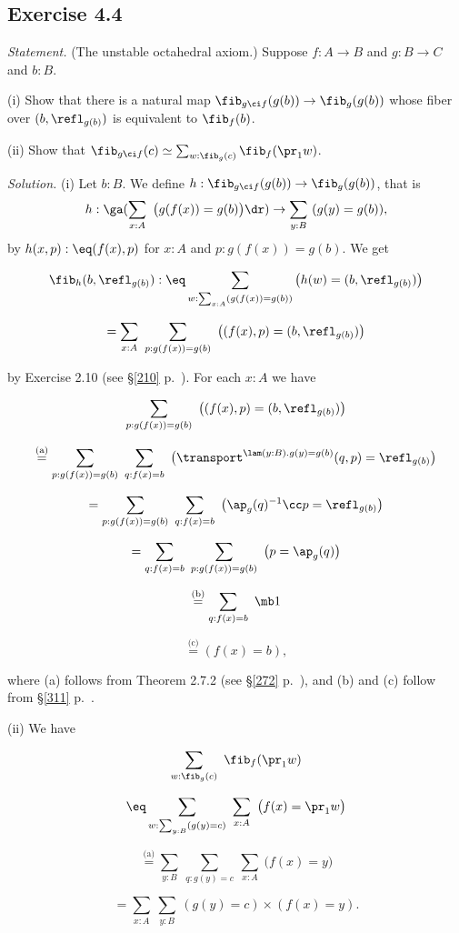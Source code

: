 \documentclass[12pt]{article}
\begin{document}

\subsection{Exercise 4.4}

\emph{Statement.} (The unstable octahedral axiom.) Suppose $f:A\to B$ and $g:B\to C$ and $b:B$.

\nn(i) Show that there is a natural map $\fib_{g\ci f}(g(b))\to\fib_g(g(b))$ whose fiber over $(b, \refl_{g(b)})$ is equivalent to $\fib_f(b)$.

\nn(ii) Show that $\fib_{g\ci f}(c)\simeq\sum_{w:\fib_g(c)}\fib_f(\pr_1w)$.

\nn\emph{Solution.} (i) Let $b:B$. We define $h:\fib_{g\ci f}(g(b))\to\fib_g(g(b))$, that is
$$
h:\ga(\sum_{x:A}\ \big(g(f(x))=g(b)\big)\dr)\to\sum_{y:B}\ (g(y)=g(b)),
$$ 
by $h(x,p):\eq(f(x),p)$ for $x:A$ and $p:g(f(x))=g(b)$. We get 

$$\fib_h(b,\refl_{g(b)}):\eq\sum_{w:\sum_{x:A}(g(f(x))=g(b))}\big(h(w)=(b,\refl_{g(b)})\big)$$ 

$$=\sum_{x:A}\ \sum_{p:g(f(x))=g(b)}\ \big((f(x),p)=(b,\refl_{g(b)})\big)$$ 

\nn by Exercise 2.10 (see \S\ref{210} p.~\pageref{210}). For each $x:A$ we have

$$\sum_{p:g(f(x))=g(b)}\ \big((f(x),p)=(b,\refl_{g(b)})\big)$$ 

$$\overset{\text{(a)}}=\sum_{p:g(f(x))=g(b)}\ \sum_{q:f(x)=b}\ \big(\transport^{\lam(y:B).g(y)=g(b)}(q,p)=\refl_{g(b)}\big)$$ 

$$=\sum_{p:g(f(x))=g(b)}\ \sum_{q:f(x)=b}\ \big(\ap_g(q)^{-1}\cc p=\refl_{g(b)}\big)$$ 

$$=\sum_{q:f(x)=b}\ \sum_{p:g(f(x))=g(b)}\ \big(p=\ap_g(q)\big)$$ 

$$\overset{\text{(b)}}=\sum_{q:f(x)=b}\ \mb1$$

$$\overset{\text{(c)}}=(f(x)=b),$$ 

\nn where (a) follows from Theorem 2.7.2 (see \S\ref{272} p.~\pageref{272}), and (b) and (c) follow from \S\ref{311} p.~\pageref{311}.

\nn(ii) We have 

$$\sum_{w:\fib_g(c)}\ \fib_f(\pr_1w)$$ 

$$\eq\sum_{w:\sum_{y:B}(g(y)=c)}\ \sum_{x:A}\ \big(f(x)=\pr_1w\big)$$ 

$$\overset{\text{(a)}}=\sum_{y:B}\ \sum_{q:g(y)=c}\ \sum_{x:A}\ \big(f(x)=y\big)$$ 

$$=\sum_{x:A}\ \sum_{y:B}\ (g(y)=c)\times(f(x)=y).$$ 
\end{document}
